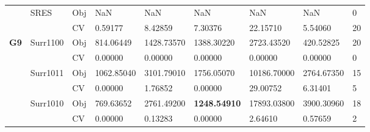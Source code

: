 \begin{table*}[!htb]
\begin{tabular}{lllllllll}
		& \multirow{2}{*}{SRES}              & Obj                                & NaN                                & NaN                                & NaN                                  & NaN                                 & NaN                               & 0                \\
		&                                    & CV                                 & 0.59177                            & 8.42859                            & 7.30376                              & 22.15710                            & 5.54060                           & 20               \\ \hline
		\multirow{16}{*}{\textbf{G9}}                & \multirow{2}{*}{Surr1100}          & Obj                                & 814.06449                          & 1428.73570                         & 1388.30220                           & 2723.43520                          & 420.52825                         & 20               \\
		&                                    & CV                                 & 0.00000                            & 0.00000                            & 0.00000                              & 0.00000                             & 0.00000                           & 0                \\
		& \multirow{2}{*}{Surr1011}          & Obj                                & 1062.85040                         & 3101.79010                         & 1756.05070                           & 10186.70000                         & 2764.67350                        & 15               \\
		&                                    & CV                                 & 0.00000                            & 1.76852                            & 0.00000                              & 29.00752                            & 6.31401                           & 5                \\
		& \multirow{2}{*}{Surr1010}          & Obj                                & 769.63652                          & 2761.49200                         & \textbf{1248.54910}                  & 17893.03800                         & 3900.30960                        & 18               \\
		&                                    & CV                                 & 0.00000                            & 0.13283                            & 0.00000                              & 2.64610                             & 0.57659                           & 2                \\

\end{tabular}
\end{table*}
